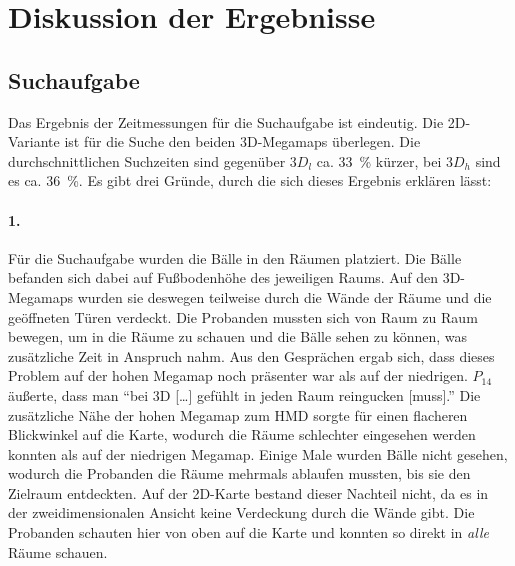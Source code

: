 \section{Diskussion der Ergebnisse}

\subsection{Suchaufgabe}
Das Ergebnis der Zeitmessungen für die Suchaufgabe ist eindeutig.
Die 2D-Variante ist für die Suche den beiden 3D-Megamaps überlegen.
Die durchschnittlichen Suchzeiten sind gegenüber $3D_l$ ca. \SI{33}{\percent} kürzer, bei $3D_h$ sind es ca. \SI{36}{\percent}.
Es gibt drei Gründe, durch die sich dieses Ergebnis erklären lässt:

\paragraph{1.} Für die Suchaufgabe wurden die Bälle in den Räumen platziert.
Die Bälle befanden sich dabei auf Fußbodenhöhe des jeweiligen Raums.
Auf den 3D-Megamaps wurden sie deswegen teilweise durch die Wände der Räume und die geöffneten Türen verdeckt.
Die Probanden mussten sich von Raum zu Raum bewegen, um in die Räume zu schauen und die Bälle sehen zu können, was zusätzliche Zeit in Anspruch nahm.
Aus den Gesprächen ergab sich, dass dieses Problem auf der hohen Megamap noch präsenter war als auf der niedrigen.
$P_{14}$ äußerte, dass man \enquote{bei 3D [\dots] gefühlt in jeden Raum reingucken [muss].}
Die zusätzliche Nähe der hohen Megamap zum HMD sorgte für einen flacheren Blickwinkel auf die Karte, wodurch die Räume schlechter eingesehen werden konnten als auf der niedrigen Megamap.
Einige Male wurden Bälle nicht gesehen, wodurch die Probanden die Räume mehrmals ablaufen mussten, bis sie den Zielraum entdeckten.
Auf der 2D-Karte bestand dieser Nachteil nicht, da es in der zweidimensionalen Ansicht keine Verdeckung durch die Wände gibt.
Die Probanden schauten hier von oben auf die Karte und konnten so direkt in \emph{alle} Räume schauen.

